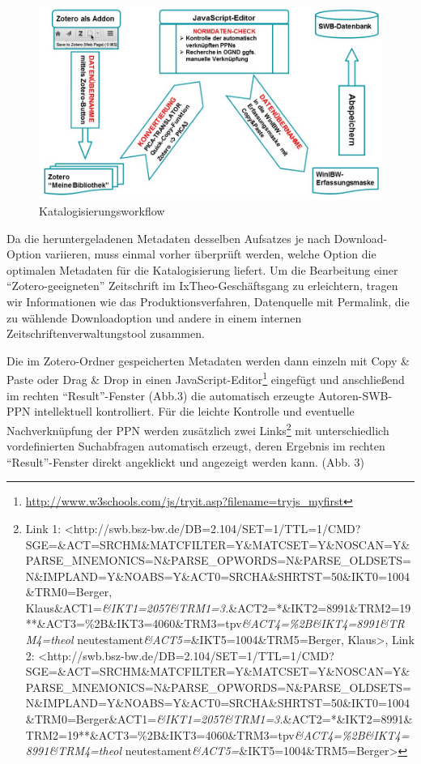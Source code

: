 \documentclass[a4paper,
fontsize=11pt,
oneside,
numbers=noperiodatend,
parskip=half-,
bibliography=totoc,
final
]{scrartcl}
\begin{document}
\begin{figure}[htbp]
\centering
\includegraphics{img/Workflow.jpg}
\caption{Katalogisierungsworkflow}
\end{figure}

Da die heruntergeladenen Metadaten desselben Aufsatzes je nach
Download-Option variieren, muss einmal vorher überprüft werden, welche
Option die optimalen Metadaten für die Katalogisierung liefert. Um die
Bearbeitung einer \enquote{Zotero-geeigneten} Zeitschrift im
IxTheo-Geschäftsgang zu erleichtern, tragen wir Informationen wie das
Produktionsverfahren, Datenquelle mit Permalink, die zu wählende
Downloadoption und andere in einem internen Zeitschriftenverwaltungstool
zusammen.

Die im Zotero-Ordner gespeicherten Metadaten werden dann einzeln mit
Copy \& Paste oder Drag \& Drop in einen JavaScript-Editor\footnote{\url{http://www.w3schools.com/js/tryit.asp?filename=tryjs_myfirst}}
eingefügt und anschließend im rechten \enquote{Result}-Fenster (Abb.3)
die automatisch erzeugte Autoren-SWB-PPN intellektuell kontrolliert. Für
die leichte Kontrolle und eventuelle Nachverknüpfung der PPN werden
zusätzlich zwei Links\footnote{Link 1:
  \textless{}http://swb.bsz-bw.de/DB=2.104/SET=1/TTL=1/CMD?SGE=\&ACT=SRCHM\&MATCFILTER=Y\&MATCSET=Y\&NOSCAN=Y\&PARSE\_MNEMONICS=N\&PARSE\_OPWORDS=N\&PARSE\_OLDSETS=N\&IMPLAND=Y\&NOABS=Y\&ACT0=SRCHA\&SHRTST=50\&IKT0=1004\&TRM0=Berger,
  Klaus\&ACT1=\emph{\&IKT1=2057\&TRM1=3.}\&ACT2=*\&IKT2=8991\&TRM2=19**\&ACT3=\%2B\&IKT3=4060\&TRM3=tpv\emph{\&ACT4=\%2B\&IKT4=8991\&TRM4=theol}
  neutestament\emph{\&ACT5=}\&IKT5=1004\&TRM5=Berger,
  Klaus\textgreater{}, Link 2:
  \textless{}http://swb.bsz-bw.de/DB=2.104/SET=1/TTL=1/CMD?SGE=\&ACT=SRCHM\&MATCFILTER=Y\&MATCSET=Y\&NOSCAN=Y\&PARSE\_MNEMONICS=N\&PARSE\_OPWORDS=N\&PARSE\_OLDSETS=N\&IMPLAND=Y\&NOABS=Y\&ACT0=SRCHA\&SHRTST=50\&IKT0=1004\&TRM0=Berger\&ACT1=\emph{\&IKT1=2057\&TRM1=3.}\&ACT2=*\&IKT2=8991\&TRM2=19**\&ACT3=\%2B\&IKT3=4060\&TRM3=tpv\emph{\&ACT4=\%2B\&IKT4=8991\&TRM4=theol}
  neutestament\emph{\&ACT5=}\&IKT5=1004\&TRM5=Berger\textgreater{}} mit
unterschiedlich vordefinierten Suchabfragen automatisch erzeugt, deren
Ergebnis im rechten \enquote{Result}-Fenster direkt angeklickt und
angezeigt werden kann. (Abb. 3)
\end{document}
